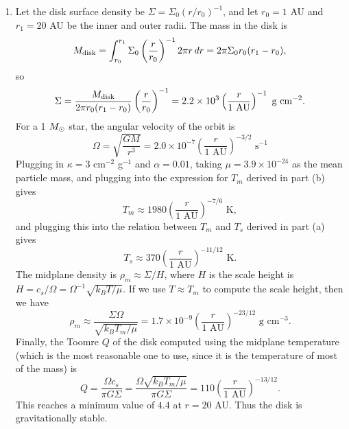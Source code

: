 \begin{enumerate}
\begin{enumerate}
\item Let the disk surface density be $\Sigma=\Sigma_0 (r/r_0)^{-1}$, and let $r_0=1$ AU and $r_1=20$ AU be the inner and outer radii. The mass in the disk is
\begin{displaymath}
M_{\rm disk} = \int_{r_0}^{r_1} \Sigma_0 \left(\frac{r}{r_0}\right)^{-1} 2 \pi r \, dr 
= 2 \pi \Sigma_0 r_0 (r_1 - r_0),
\end{displaymath}
so 
\begin{displaymath}
\Sigma = \frac{M_{\rm disk}}{2 \pi r_0 (r_1 - r_0)} \left(\frac{r}{r_0}\right)^{-1} = 2.2\times 10^3\left(\frac{r}{1\mbox{ AU}}\right)^{-1}\mbox{ g cm}^{-2}.
\end{displaymath}
For a 1 $M_{\odot}$ star, the angular velocity of the orbit is
\begin{displaymath}
\Omega = \sqrt{\frac{GM}{r^3}} = 2.0\times 10^{-7} \left(\frac{r}{1\mbox{ AU}}\right)^{-3/2}\mbox{ s}^{-1}
\end{displaymath}
Plugging in $\kappa=3$ cm$^{-2}$ g$^{-1}$ and $\alpha=0.01$, taking $\mu=3.9\times 10^{-24}$ as the mean particle mass, and plugging into the expression for $T_m$ derived in part (b) gives
\begin{displaymath}
T_m \approx 1980 \left(\frac{r}{1\mbox{ AU}}\right)^{-7/6}\mbox{ K},
\end{displaymath}
and plugging this into the relation between $T_m$ and $T_s$ derived in part (a) gives
\begin{displaymath}
T_s \approx 370 \left(\frac{r}{1\mbox{ AU}}\right)^{-11/12}\mbox{ K}.
\end{displaymath}
The midplane density is $\rho_m\approx \Sigma/H$, where $H$ is the scale height is $H = c_s/\Omega = \Omega^{-1}\sqrt{k_B T/\mu}$. If we use $T\approx T_m$ to compute the scale height, then we have
\begin{displaymath}
\rho_m \approx \frac{\Sigma\Omega}{\sqrt{k_B T_m/\mu}} = 1.7\times 10^{-9} \left(\frac{r}{1\mbox{ AU}}\right)^{-23/12}\mbox{ g cm}^{-3}.
\end{displaymath}
Finally, the Toomre $Q$ of the disk computed using the midplane temperature (which is the most reasonable one to use, since it is the temperature of most of the mass) is
\begin{displaymath}
Q = \frac{\Omega c_s}{\pi G \Sigma} = \frac{\Omega \sqrt{k_B T_m/\mu}}{\pi G \Sigma} = 110 \left(\frac{r}{1\mbox{ AU}}\right)^{-13/12}.
\end{displaymath}
This reaches a minimum value of $4.4$ at $r=20$ AU. Thus the disk is gravitationally stable.

\end{enumerate}

\end{enumerate}
